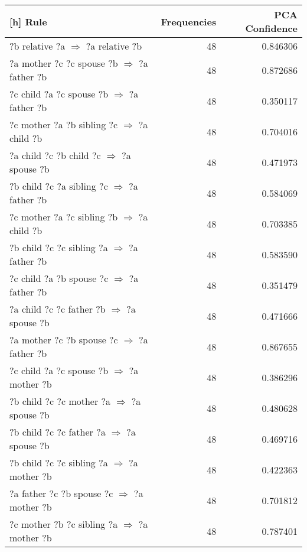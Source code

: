 \begin{longtable}{lrr}[h]
\toprule
                                                    Rule &  Frequencies &  PCA Confidence \\
\midrule
                  ?b  relative  ?a   $\Rightarrow$ ?a  relative  ?b &           48 &        0.846306 \\
      ?a  mother  ?c  ?c  spouse  ?b   $\Rightarrow$ ?a  father  ?b &           48 &        0.872686 \\
       ?c  child  ?a  ?c  spouse  ?b   $\Rightarrow$ ?a  father  ?b &           48 &        0.350117 \\
      ?c  mother  ?a  ?b  sibling  ?c   $\Rightarrow$ ?a  child  ?b &           48 &        0.704016 \\
        ?a  child  ?c  ?b  child  ?c   $\Rightarrow$ ?a  spouse  ?b &           48 &        0.471973 \\
      ?b  child  ?c  ?a  sibling  ?c   $\Rightarrow$ ?a  father  ?b &           48 &        0.584069 \\
      ?c  mother  ?a  ?c  sibling  ?b   $\Rightarrow$ ?a  child  ?b &           48 &        0.703385 \\
      ?b  child  ?c  ?c  sibling  ?a   $\Rightarrow$ ?a  father  ?b &           48 &        0.583590 \\
       ?c  child  ?a  ?b  spouse  ?c   $\Rightarrow$ ?a  father  ?b &           48 &        0.351479 \\
       ?a  child  ?c  ?c  father  ?b   $\Rightarrow$ ?a  spouse  ?b &           48 &        0.471666 \\
      ?a  mother  ?c  ?b  spouse  ?c   $\Rightarrow$ ?a  father  ?b &           48 &        0.867655 \\
       ?c  child  ?a  ?c  spouse  ?b   $\Rightarrow$ ?a  mother  ?b &           48 &        0.386296 \\
       ?b  child  ?c  ?c  mother  ?a   $\Rightarrow$ ?a  spouse  ?b &           48 &        0.480628 \\
       ?b  child  ?c  ?c  father  ?a   $\Rightarrow$ ?a  spouse  ?b &           48 &        0.469716 \\
      ?b  child  ?c  ?c  sibling  ?a   $\Rightarrow$ ?a  mother  ?b &           48 &        0.422363 \\
      ?a  father  ?c  ?b  spouse  ?c   $\Rightarrow$ ?a  mother  ?b &           48 &        0.701812 \\
     ?c  mother  ?b  ?c  sibling  ?a   $\Rightarrow$ ?a  mother  ?b &           48 &        0.787401 \\

\end{longtable}

